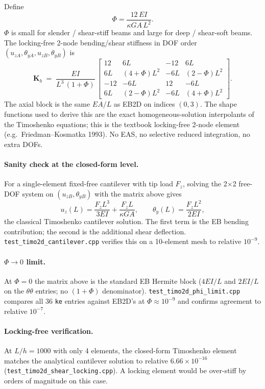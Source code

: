 \documentclass[11pt,a4paper]{book}
\newcommand{\bmath}[1]{\boldsymbol{#1}}
\begin{document}
Define
\[
\boxed{\;\Phi = \dfrac{12\,EI}{\kappa GA\,L^2}.\;}
\]
$\Phi$ is small for slender / shear-stiff beams and large for deep / shear-soft beams. The locking-free 2-node bending/shear stiffness in DOF order $(u_{zA}, \theta_{yA}, u_{zB}, \theta_{yB})$ is
\[
\boxed{\;
\bmath{K}_b \;=\; \dfrac{EI}{L^3\,(1+\Phi)}\,
\begin{bmatrix}
12      & 6L          & -12     & 6L         \\
6L      & (4+\Phi)L^2 & -6L     & (2-\Phi)L^2 \\
-12     & -6L         & 12      & -6L        \\
6L      & (2-\Phi)L^2 & -6L     & (4+\Phi)L^2
\end{bmatrix}.
\;}
\]
The axial block is the same $EA/L$ as EB2D on indices $(0, 3)$. The shape functions used to derive this are the exact homogeneous-solution interpolants of the Timoshenko equations; this is the textbook locking-free 2-node element (e.g.\ Friedman--Kosmatka 1993). No EAS, no selective reduced integration, no extra DOFs.

\paragraph{Sanity check at the closed-form level.}
For a single-element fixed-free cantilever with tip load $F_z$, solving the 2$\times$2 free-DOF system on $(u_{zB}, \theta_{yB})$ with the matrix above gives
\[
u_z(L) = \dfrac{F_z L^3}{3 EI} + \dfrac{F_z L}{\kappa GA},
\qquad
\theta_y(L) = \dfrac{F_z L^2}{2 EI},
\]
the classical Timoshenko cantilever solution. The first term is the EB bending contribution; the second is the additional shear deflection. \texttt{test\_timo2d\_cantilever.cpp} verifies this on a 10-element mesh to relative $10^{-9}$.

\paragraph{$\Phi \to 0$ limit.}
At $\Phi = 0$ the matrix above is the standard EB Hermite block ($4 EI/L$ and $2 EI/L$ on the $\theta\theta$ entries; no $(1+\Phi)$ denominator). \texttt{test\_timo2d\_phi\_limit.cpp} compares all 36 \texttt{ke} entries against EB2D's at $\Phi \approx 10^{-9}$ and confirms agreement to relative $10^{-7}$.

\paragraph{Locking-free verification.}
At $L/h = 1000$ with only 4 elements, the closed-form Timoshenko element matches the analytical cantilever solution to relative $6.66 \times 10^{-16}$ (\texttt{test\_timo2d\_shear\_locking.cpp}). A locking element would be over-stiff by orders of magnitude on this case.
\end{document}
